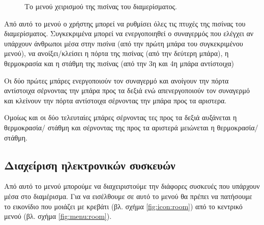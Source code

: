 \documentclass{assignment}
\begin{document}
\begin{figure}
\begin{center}
\caption{Το μενού χειρισμού της πισίνας του διαμερίσματος.}
\label{fig:menu:pool}
\end{center}
\end{figure}

Από αυτό το μενού ο χρήστης μπορεί να ρυθμίσει όλες τις πτυχές της πισίνας του διαμερίσματος. Συγκεκριμένα μπορεί να ενεργοποιηθεί ο συναγερμός που ελέγχει αν υπάρχουν άνθρωποι μέσα στην πισίνα (από την πρώτη μπάρα του συγκεκριμένου μενού), να ανοίξει/κλείσει η πόρτα της πισίνας (από την δεύτερη μπάρα), η θερμοκρασία και η στάθμη της πισίνας (από την 3η και 4η μπάρα αντίστοιχα)

Οι δύο πρώτες μπάρες ενεργοποιούν τον συναγερμό και ανοίγουν την πόρτα αντίστοιχα σέρνοντας την μπάρα προς τα δεξιά ενώ απενεργοποιούν τον συναγερμό και κλείνουν την πόρτα αντίστοιχα σέρνοντας την μπάρα προς τα αριστερα.

Ομοίως και οι δύο τελευταίες μπάρες σέρνοντας τες προς τα δεξιά αυξάνεται η θερμοκρασία/ στάθμη και σέρνοντας της προς τα αριστερά μειώνεται η θερμοκρασία/στάθμη.

\subsection{Διαχείριση ηλεκτρονικών συσκευών}
\label{syskeuves}

Από αυτό το μενού μπορούμε να διαχειριστούμε την διάφορες συσκευές που υπάρχουν μέσα στο διαμέρισμα. Για να εισέλθουμε σε αυτό το μενού θα πρέπει να πατήσουμε το εικονίδιο που μοιάζει με κρεβάτι (βλ. σχήμα \ref{fig:icon:room}) από το κεντρικό μενού (βλ. σχήμα \ref{fig:menu:room}).
\end{document}
